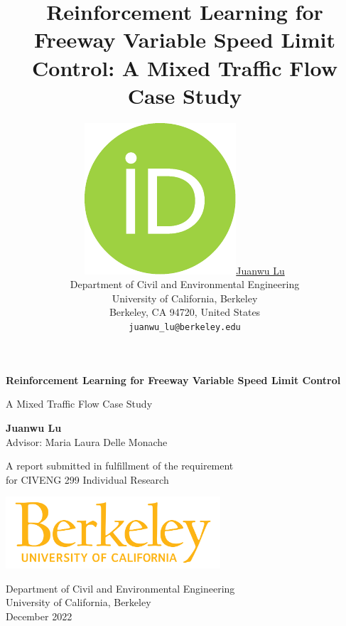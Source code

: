\documentclass[11pt, letterpaper]{article}
\title{Reinforcement Learning for Freeway Variable Speed Limit Control: A Mixed Traffic Flow Case Study}
\author{ \href{https://orcid.org/0000-0003-0831-1244}{\includegraphics[scale=0.06]{orcid.pdf}\hspace{1mm}Juanwu Lu} \\
	Department of Civil and Environmental Engineering\\
	University of California, Berkeley\\
	Berkeley, CA 94720, United States \\
	\texttt{juanwu\_lu@berkeley.edu} \\
}
\date{}
\begin{document}
\begin{titlepage}
    \begin{center}
        \vspace*{2cm}
            
        \Huge
        \textbf{Reinforcement Learning for Freeway Variable Speed Limit Control}
            
        \vspace{0.5cm}
        \LARGE
        A Mixed Traffic Flow Case Study
            
        \vspace{1.5cm}
            
        \textbf{Juanwu Lu} \\
        Advisor: Maria Laura Delle Monache
        
            
        \vfill

        \large
        A report submitted in fulfillment of the requirement \\
        for CIVENG 299 Individual Research \\

        \vspace{0.8cm}

        \includegraphics[width=0.6\textwidth]{img/logo.png}
        
        \Large
        Department of Civil and Environmental Engineering\\
        University of California, Berkeley \\
        December 2022
    \end{center}
\end{titlepage}

\maketitle
\end{document}
